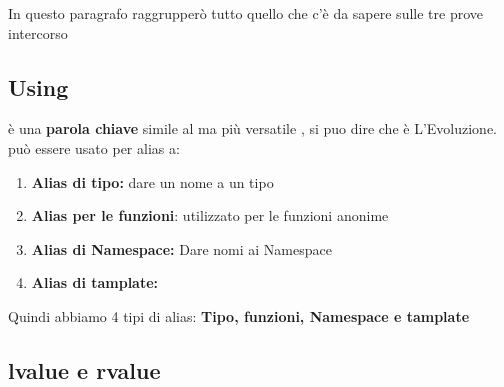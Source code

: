 In questo paragrafo raggrupperò tutto quello che c'è da sapere sulle tre prove intercorso

\subsection{Using}
\textcolor{blue}{} è una \textbf{parola chiave} simile al  ma più versatile , si puo dire che è L'Evoluzione. \textcolor{blue}{} può essere usato per alias a:

\begin{enumerate}
    \item \textbf{Alias di tipo:} dare un nome a un tipo
    \begin{tcolorbox}[width=12cm, boxsep=10pt]
        
    \end{tcolorbox}
    \item \textbf{Alias per le funzioni}: utilizzato per le funzioni anonime
    \begin{tcolorbox}[width=14cm, boxsep=10pt]
        
    \end{tcolorbox}
    \newpage
    \item \textbf{Alias di Namespace:} Dare nomi ai Namespace
    \begin{tcolorbox}[width=14cm, boxsep=10pt]
        
    \end{tcolorbox}
    \item \textbf{Alias di tamplate:}
    \begin{tcolorbox}[width=14cm, boxsep=10pt]
        
    \end{tcolorbox}
\end{enumerate}

Quindi abbiamo 4 tipi di alias: \textbf{Tipo, funzioni, Namespace e tamplate}
\newpage
\subsection{lvalue e rvalue}
